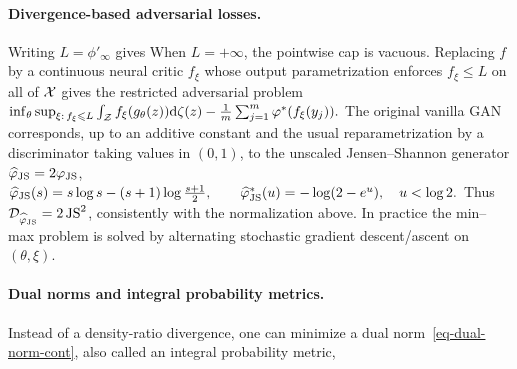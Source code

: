 \paragraph{Divergence-based adversarial losses.}
Writing $L=\phi'_\infty$ gives
When $L=+\infty$, the pointwise cap is vacuous. Replacing $f$ by a continuous neural critic $f_\xi$ whose output parametrization enforces $f_\xi\leq L$ on all of $\mathcal{X}$ gives the restricted adversarial problem
\(\inf_\theta\sup_{\xi:\,f_\xi\leqslant L} \int_{\mathcal{Z}} f_\xi(g_\theta(z))\mathrm{d}\zeta(z) - \frac1m\sum_{j=1}^m \varphi^*(f_\xi(y_j)).\)
The original vanilla GAN corresponds, up to an additive constant and the usual reparametrization by a discriminator taking values in $(0,1)$, to the unscaled Jensen--Shannon generator $\widehat{\varphi}_{\operatorname{JS}}=2\varphi_{\operatorname{JS}}$,
\(\widehat{\varphi}_{\operatorname{JS}}(s)=s\log s-(s+1)\log\frac{s+1}{2}, \qquad \widehat{\varphi}_{\operatorname{JS}}^*(u)=-\log(2-e^u),\quad u<\log 2.\)
Thus $\mathcal{D}_{\widehat{\varphi}_{\operatorname{JS}}}=2\operatorname{JS}^2$, consistently with the normalization above. In practice the min--max problem is solved by alternating stochastic gradient descent/ascent on $(\theta,\xi)$.

\paragraph{Dual norms and integral probability metrics.}
Instead of a density-ratio divergence, one can minimize a dual norm~\eqref{eq-dual-norm-cont}, also called an integral probability metric,
